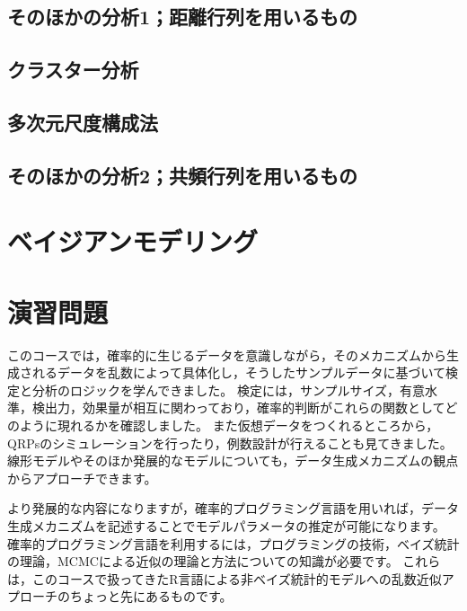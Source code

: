 \documentclass[
  a4paper,
]{ltjsbook}
\begin{document}
\section{そのほかの分析1；距離行列を用いるもの}\label{ux305dux306eux307bux304bux306eux5206ux67901ux8dddux96e2ux884cux5217ux3092ux7528ux3044ux308bux3082ux306e}

\section{クラスター分析}\label{ux30afux30e9ux30b9ux30bfux30fcux5206ux6790}

\section{多次元尺度構成法}\label{ux591aux6b21ux5143ux5c3aux5ea6ux69cbux6210ux6cd5}

\section{そのほかの分析2；共頻行列を用いるもの}\label{ux305dux306eux307bux304bux306eux5206ux67902ux5171ux983bux884cux5217ux3092ux7528ux3044ux308bux3082ux306e}


\chapter{ベイジアンモデリング}\label{ux30d9ux30a4ux30b8ux30a2ux30f3ux30e2ux30c7ux30eaux30f3ux30b0}


\chapter{演習問題}\label{ux6f14ux7fd2ux554fux984c}

このコースでは，確率的に生じるデータを意識しながら，そのメカニズムから生成されるデータを乱数によって具体化し，そうしたサンプルデータに基づいて検定と分析のロジックを学んできました。
検定には，サンプルサイズ，有意水準，検出力，効果量が相互に関わっており，確率的判断がこれらの関数としてどのように現れるかを確認しました。
また仮想データをつくれるところから，QRPsのシミュレーションを行ったり，例数設計が行えることも見てきました。
線形モデルやそのほか発展的なモデルについても，データ生成メカニズムの観点からアプローチできます。

より発展的な内容になりますが，確率的プログラミング言語を用いれば，データ生成メカニズムを記述することでモデルパラメータの推定が可能になります。
確率的プログラミング言語を利用するには，プログラミングの技術，ベイズ統計の理論，MCMCによる近似の理論と方法についての知識が必要です。
これらは，このコースで扱ってきたR言語による非ベイズ統計的モデルへの乱数近似アプローチのちょっと先にあるものです。
\end{document}
